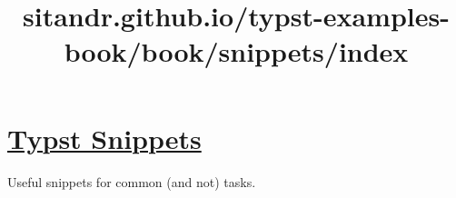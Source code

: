 \title{sitandr.github.io/typst-examples-book/book/snippets/index}

\section{\texorpdfstring{\hyperref[typst-snippets]{Typst
Snippets}}{Typst Snippets}}\label{typst-snippets}

Useful snippets for common (and not) tasks.
